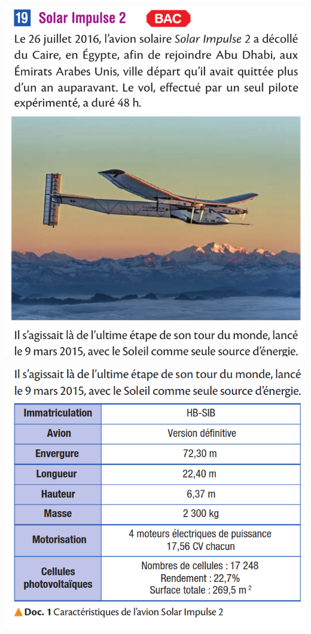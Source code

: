 \documentclass[10pt]{article}
\begin{document}
\begin{minipage}[c]{0.45\textwidth}
	\includegraphics[scale=0.31]{avion_clx/1.png}

	\includegraphics[scale=0.31]{avion_clx/2.png}


\end{minipage}
\end{document}
